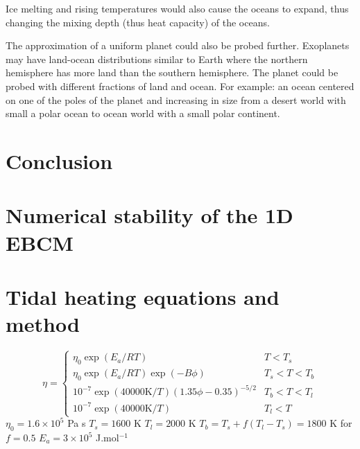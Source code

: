 \documentclass[12pt, onecolumn]{revtex4-2}    %
\begin{document}
Ice melting and rising temperatures would also cause the oceans to expand, thus changing the mixing depth (thus heat capacity) of the oceans.

The approximation of a uniform planet could also be probed further.
Exoplanets may have land-ocean distributions similar to Earth where the northern hemisphere has more land than the southern hemisphere.
The planet could be probed with different fractions of land and ocean.
For example: an ocean centered on one of the poles of the planet and increasing in size from a desert world with small a polar ocean to ocean world with a small polar continent.

\section{Conclusion} \label{sec:Conclusion}






\clearpage

\appendix

\section{Numerical stability of the 1D EBCM} \label{appx:NumStability}

\section{Tidal heating equations and method} \label{appx:TidalHeatingEquationsMethod}
\begin{equation}
  \eta = 
  \begin{cases}
    \eta_0 \exp{(E_a / R T)} & T < T_s \\
    \eta_0 \exp{(E_a / R T)} \exp{(-B \phi)} & T_s < T < T_b \\
    10^{-7} \exp{(40000\text{K} / T)} (1.35 \phi - 0.35)^{-5/2} & T_b < T < T_l \\
    10^{-7} \exp{(40000\text{K} / T)} & T_l < T
  \end{cases}
\end{equation}
$\eta_0 = 1.6 \times 10^5$ Pa s
$T_s = 1600$ K
$T_l = 2000$ K
$T_b = T_s + f (T_l - T_s) = 1800$ K for $f=0.5$
$E_a = 3\times10^5$ J.mol$^{-1}$
\end{document}
